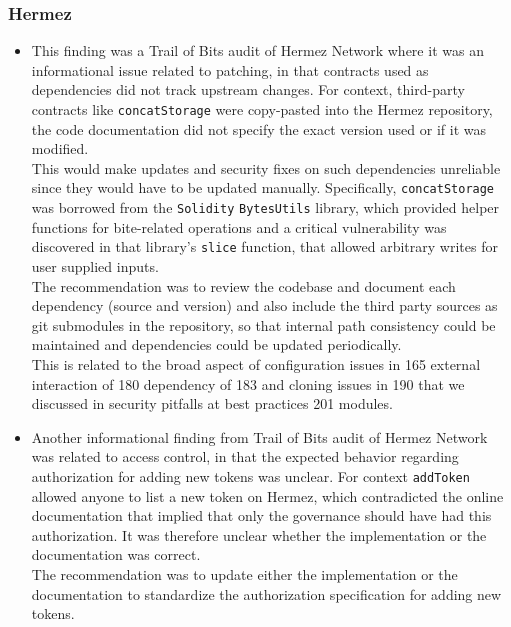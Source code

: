 \subsubsection{Hermez}\label{hermez}

\begin{itemize}
\item
  This finding was a Trail of Bits audit of Hermez Network where it was
  an informational issue related to patching, in that contracts used as
  dependencies did not track upstream changes. For context, third-party
  contracts like \texttt{concatStorage} were copy-pasted into the Hermez
  repository, the code documentation did not specify the exact version
  used or if it was modified.\\

  This would make updates and security fixes on such dependencies
  unreliable since they would have to be updated manually. Specifically,
  \texttt{concatStorage} was borrowed from the \texttt{Solidity}
  \texttt{BytesUtils} library, which provided helper functions for
  bite-related operations and a critical vulnerability was discovered in
  that library's \texttt{slice} function, that allowed arbitrary writes
  for user supplied inputs.\\

  The recommendation was to review the codebase and document each
  dependency (source and version) and also include the third party
  sources as git submodules in the repository, so that internal path
  consistency could be maintained and dependencies could be updated
  periodically.\\

  This is related to the broad aspect of configuration issues in 165
  external interaction of 180 dependency of 183 and cloning issues in
  190 that we discussed in security pitfalls at best practices 201
  modules.
\item
  Another informational finding from Trail of Bits audit of Hermez
  Network was related to access control, in that the expected behavior
  regarding authorization for adding new tokens was unclear. For context
  \texttt{addToken} allowed anyone to list a new token on Hermez, which
  contradicted the online documentation that implied that only the
  governance should have had this authorization. It was therefore
  unclear whether the implementation or the documentation was correct.\\

  The recommendation was to update either the implementation or the
  documentation to standardize the authorization specification for
  adding new tokens.\\


\end{itemize}
